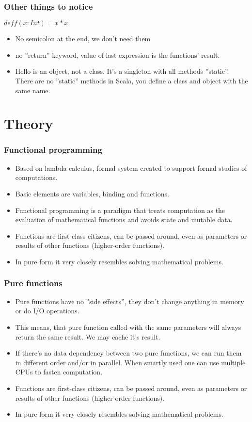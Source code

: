 \documentclass[xcolor=dvipsnames]{beamer}
\begin{document}
\begin{frame}
\frametitle{Other things to notice}
$def f(x: Int) = x * x$
\begin{itemize}
\item No semicolon at the end, we don't need them
\item no ''return'' keyword, value of last expression is the functions' result.
\item Hello is an object, not a class. It's a singleton with all methods ''static''. There are no ''static'' methods in Scala, you define a class and object with the same name.
\end{itemize}
\end{frame}


\section{Theory}

\begin{frame}
\frametitle{Functional programming}
\begin{itemize}
\item Based on lambda calculus, formal system created to support formal studies of computations.
\item Basic elements are variables, binding and functions.
\item Functional programming is a paradigm that treats computation as the evaluation of mathematical functions and avoids state and mutable data.
\item Functions are first-class citizens, can be passed around, even as parameters or results of other functions (higher-order functions).
\item In pure form it very closely resembles solving mathematical problems.
\end{itemize}
\end{frame}

\begin{frame}
\frametitle{Pure functions}
\begin{itemize}
\item Pure functions have no ''side effects'', they don't change anything in memory or do I/O operations.
\item This means, that pure function called with the same parameters will always return the same result. We may cache it's result.
\item If there's no data dependency between two pure functions, we can run them in different order and/or in parallel. When smartly used one can use multiple CPUs to fasten computation.
\item Functions are first-class citizens, can be passed around, even as parameters or results of other functions (higher-order functions).
\item In pure form it very closely resembles solving mathematical problems.
\end{itemize}
\end{frame}
\end{document}
